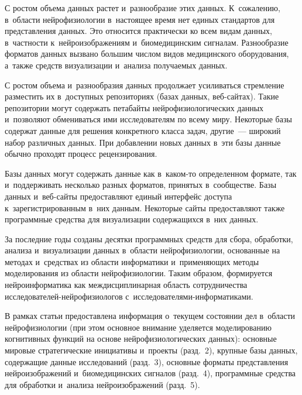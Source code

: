 \begin{multicols}{2}
{} 
    
    С ростом объема данных растет и~разнообразие этих данных. 
К~сожалению, в~об\-ласти нейрофизиологии в~настоящее время нет единых 
стандартов для пред\-став\-ле\-ния данных. Это относится практически ко всем 
видам данных, в~част\-ности к~нейроизображениям и~биомедицинским 
сигналам. Разнообразие форматов данных вызвано большим чис\-лом видов 
медицинского оборудования, а~также средств визуализации и~анализа 
получаемых данных.
{

}
    
    С ростом объема и~разнообразия данных продолжает усиливаться 
стремление разместить их в~доступных репозиториях (базах данных, веб-сай\-тах). 
Такие репозитории могут содержать петабайты 
нейрофизиологических данных и~позволяют обмениваться ими 
исследователям по всему миру. Некоторые базы содержат данные для 
решения конкретного класса задач, другие~--- широкий набор различных 
данных. При добавлении новых данных в~эти базы данные обычно проходят 
процесс рецензирования. 

Базы данных могут содержать данные как  
в~ка\-ком-то определенном формате, так и~поддерживать несколько разных 
форматов, принятых в~сообществе. Базы данных и~веб-сай\-ты предоставляют 
единый интерфейс доступа к~зарегистрированным в~них данным. Некоторые 
сайты предоставляют также программные средства для визуализации 
содержащихся в~них данных. 
{ %

}
    
    За последние годы созданы десятки про\-грам\-мных средств для сбора, 
обработки, анализа и~визуализации данных в~области нейрофизиологии, 
основанные на методах и~средствах из области информатики и~применяющих 
методы моделирования из области нейрофизиологии. Таким образом,\linebreak 
формируется нейроинформатика как меж\-дис\-цип\-ли\-нар\-ная об\-ласть 
сотрудничества ис\-сле\-до\-ва\-те\-лей-ней\-ро\-фи\-зио\-ло\-гов  
с~ис\-сле\-до\-ва\-те\-ля\-ми-ин\-фор\-ма\-ти\-ками.
    
    В рамках статьи предоставлена информация о~текущем состоянии дел 
в~об\-ласти нейрофизиологии (при этом основное внимание уделяется 
моделированию когнитивных функций на основе нейрофизиологических 
данных): основные мировые стратегические инициативы и~проекты (разд.~2), 
крупные базы данных, содержащие данные исследований (разд.~3), основные 
форматы представления нейроизображений и~биомедицинских сигналов 
(разд.~4), программные средства для обработки и~анализа нейроизображений 
(разд.~5). 


\end{multicols}
